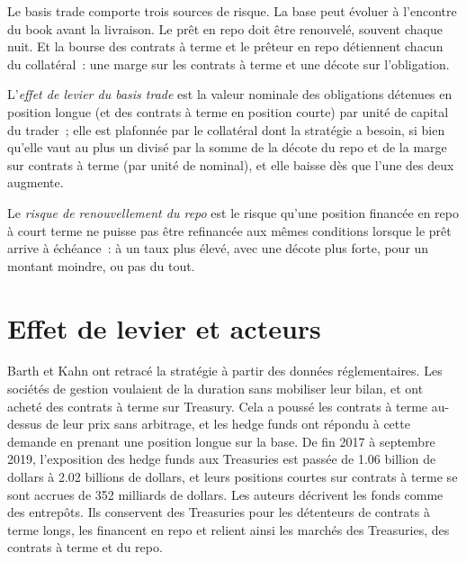 Le basis trade comporte trois sources de risque. La base peut évoluer à l'encontre du book avant la livraison. Le prêt en repo doit être renouvelé, souvent chaque nuit. Et la
bourse des contrats à terme et le prêteur en repo détiennent chacun du collatéral~: une marge sur les contrats à terme et une décote sur l'obligation.

\begin{definition}\label{def:s2:the-bond-futures-basis-trade:leverage}
L'\emph{effet de levier du basis trade} est la valeur nominale des obligations détenues en position longue (et des contrats à terme en position courte) par unité de capital du trader~; elle
est plafonnée par le collatéral dont la stratégie a besoin, si bien qu'elle vaut au plus un divisé par la somme de la décote du repo et de la marge sur contrats à terme (par unité de nominal), et elle baisse dès que
l'une des deux augmente.
\end{definition}

\begin{definition}\label{def:s2:the-bond-futures-basis-trade:rollover}
Le \emph{risque de renouvellement du repo} est le risque qu'une position financée en repo à court terme ne puisse pas être refinancée aux mêmes conditions
lorsque le prêt arrive à échéance~: à un taux plus élevé, avec une décote plus forte, pour un montant moindre, ou pas du tout.
\end{definition}

\section{Effet de levier et acteurs}

Barth et Kahn ont retracé la stratégie à partir des données réglementaires. Les sociétés de gestion voulaient de la duration sans mobiliser leur bilan, et ont acheté des contrats à terme sur Treasury.
Cela a poussé les contrats à terme au-dessus de leur prix sans arbitrage, et les hedge funds ont répondu à cette demande en prenant une position longue sur la base. De fin 2017 à septembre 2019,
l'exposition des hedge funds aux Treasuries est passée de 1.06 billion de dollars à 2.02 billions de dollars, et leurs positions courtes sur contrats à terme se sont accrues de 352 milliards de dollars. Les auteurs décrivent les fonds comme
des entrepôts. Ils conservent des Treasuries pour les détenteurs de contrats à terme longs, les financent en repo et relient ainsi les marchés des Treasuries, des contrats à terme et du repo.

